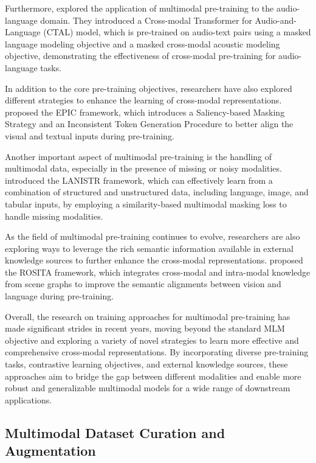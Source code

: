 \documentclass[11pt]{article}
\begin{document}
Furthermore, \cite{ref124} explored the application of multimodal pre-training to the audio-language domain. They introduced a Cross-modal Transformer for Audio-and-Language (CTAL) model, which is pre-trained on audio-text pairs using a masked language modeling objective and a masked cross-modal acoustic modeling objective, demonstrating the effectiveness of cross-modal pre-training for audio-language tasks.

In addition to the core pre-training objectives, researchers have also explored different strategies to enhance the learning of cross-modal representations. \cite{ref125} proposed the EPIC framework, which introduces a Saliency-based Masking Strategy and an Inconsistent Token Generation Procedure to better align the visual and textual inputs during pre-training.

Another important aspect of multimodal pre-training is the handling of multimodal data, especially in the presence of missing or noisy modalities. \cite{ref33} introduced the LANISTR framework, which can effectively learn from a combination of structured and unstructured data, including language, image, and tabular inputs, by employing a similarity-based multimodal masking loss to handle missing modalities.

As the field of multimodal pre-training continues to evolve, researchers are also exploring ways to leverage the rich semantic information available in external knowledge sources to further enhance the cross-modal representations. \cite{ref126} proposed the ROSITA framework, which integrates cross-modal and intra-modal knowledge from scene graphs to improve the semantic alignments between vision and language during pre-training.

Overall, the research on training approaches for multimodal pre-training has made significant strides in recent years, moving beyond the standard MLM objective and exploring a variety of novel strategies to learn more effective and comprehensive cross-modal representations. By incorporating diverse pre-training tasks, contrastive learning objectives, and external knowledge sources, these approaches aim to bridge the gap between different modalities and enable more robust and generalizable multimodal models for a wide range of downstream applications.

\subsection{Multimodal Dataset Curation and Augmentation}
\end{document}

